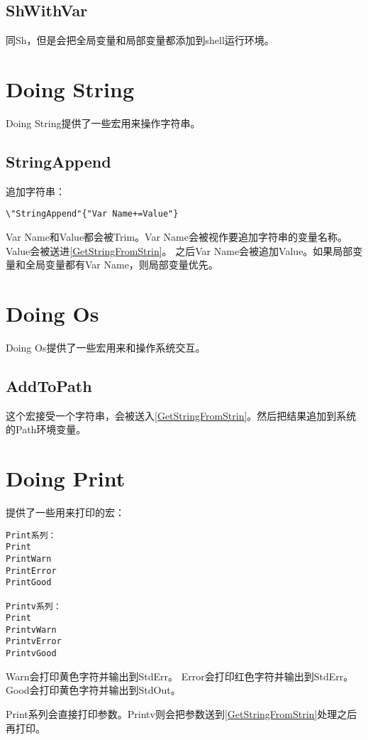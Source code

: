 \subsection{ShWithVar}
同Sh，但是会把全局变量和局部变量都添加到shell运行环境。

\section{Doing String}
Doing String提供了一些宏用来操作字符串。  

\subsection{StringAppend}
追加字符串：
\begin{lstlisting}
\"StringAppend"{"Var Name+=Value"}
\end{lstlisting}
Var Name和Value都会被Trim。Var Name会被视作要追加字符串的变量名称。Value会被送进\ref{GetStringFromStrin}。
之后Var Name会被追加Value。如果局部变量和全局变量都有Var Name，则局部变量优先。


\section{Doing Os}
Doing Os提供了一些宏用来和操作系统交互。

\subsection{AddToPath}
这个宏接受一个字符串，会被送入\ref{GetStringFromStrin}。然后把结果追加到系统的Path环境变量。

\section{Doing Print}
提供了一些用来打印的宏：

\begin{lstlisting}
Print系列：
Print
PrintWarn
PrintError
PrintGood

Printv系列：
Print
PrintvWarn
PrintvError
PrintvGood
\end{lstlisting}
Warn会打印黄色字符并输出到StdErr。\newline{}
Error会打印红色字符并输出到StdErr。\newline{}
Good会打印黄色字符并输出到StdOut。\newline{}

Print系列会直接打印参数。Printv则会把参数送到\ref{GetStringFromStrin}处理之后再打印。


